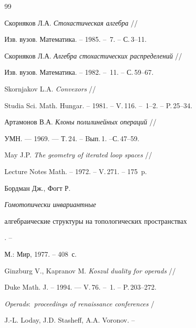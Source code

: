 \begin{thebibliography}{99}





 Скорняков Л.А. {\it Стохастическая алгебра} //


Изв. вузов. Математика. -- 1985. -- \No\,7. -- С.\,3--11.





 Скорняков Л.А. {\it Алгебра стохастических распределений} //


Изв. вузов. Математика. -- 1982. -- \No\,11. -- С.\,59--67.





 Skornjakov L.A. {\em Convexors} //


Studia Sci. Math. Hungar. -- 1981. -- V.\,116. -- \No\,1--2. -- P.\,25--34.





 Артамонов В.А. {\em Клоны полилинейных операций} //


УМН. --- 1969. --- Т.\,24. -- Bып.\,1. --\linebreak С.\,47--59.





 May J.P. {\em The geometry of iterated loop spaces} //


Lecture Notes Math. -- 1972. -- V.\,271. -- 175~p.







 Бордман Дж., Фогт Р. {\it Гомотопически инвариантные


алгебраические структуры на топологических пространствах}. --


М.: Мир, 1977. -- 408~с.





 Ginzburg V., Kapranov M. {\em Koszul duality for operads} //


Duke Math. J. -- 1994. --- V.\,76. -- \No\,1. -- P.\,203--272.





 {\em Operads$:$ proceedings of renaissance conferences} /


J.-L. Loday, J.D. Stasheff, A.A. Voronov. --



\end{thebibliography}
